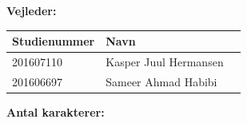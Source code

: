 \begin{center}
	\textbf{Vejleder:} \\
	\vspace{5pt}
	\begin{tabular}{l|ll}
		\textbf{Studienummer} & \textbf{Navn}\\ [5px]
		\hline
		201607110 & Kasper Juul Hermansen\\
		\hline
		201606697 & Sameer Ahmad Habibi \\
	\end{tabular}

	\ifdefined\frontpageCharacters
		\vspace{10pt}
		\textbf{Antal karakterer: } \frontpageCharacters\\
	\fi
	\vspace{30pt}

\end{center}
